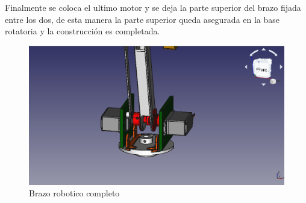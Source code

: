 Finalmente se coloca el ultimo motor y se deja la parte superior del brazo fijada entre los dos, de esta manera la parte superior queda asegurada en la base rotatoria y la construcción es completada.


\begin{figure}[H]
    \centering 
    \includegraphics[width=1\linewidth]{pictures/SandwichMotores.png}
    \caption{Brazo robotico completo}
    \label{fig:brazo_robotico_completo}
\end{figure}
